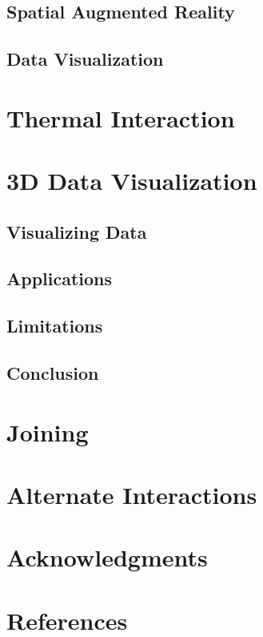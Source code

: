 \documentclass{sig-alternate}
\begin{document}
\subsection{Spatial Augmented Reality}
\label{sec:Spatial Augmented Reality}

\subsection{Data Visualization}
\label{sec:Data Visualization}

\section{Thermal Interaction}
\label{sec:Thermal Interaction}

\section{3D Data Visualization}
\label{sec:3D Data Visualization}

\subsection{Visualizing Data}
\label{sec:Visualizing Data}

\subsection{Applications}
\label{sec:Applications}

\subsection{Limitations}
\label{sec:Limitations}

\subsection{Conclusion}
\label{sec:Conclusion}

\section{Joining}
\label{sec:Joining}

\section{Alternate Interactions}
\label{sec:Alternate Interactions}

\section{Acknowledgments}
\label{sec:Acknowledgments}

\section{References}
\label{sec:References}
\end{document}
